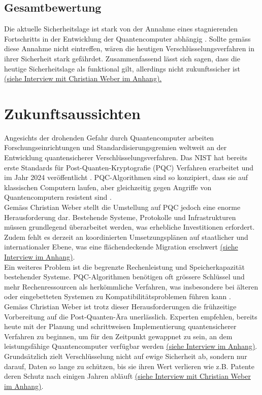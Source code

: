 \subsection{Gesamtbewertung}
Die aktuelle Sicherheitslage ist stark von der Annahme eines
stagnierenden Fortschritts in der Entwicklung der Quantencomputer
abhängig \cite{mandrysch2016}.
Sollte gemäss diese Annahme nicht eintreffen, wären die heutigen
Verschlüsselungsverfahren in ihrer Sicherheit stark gefährdet.
Zusammenfassend lässt sich sagen, dass die heutige Sicherheitslage als
funktional gilt, allerdings nicht zukunftssicher ist \hyperlink{overall_security}{(siehe Interview mit Christian Weber im Anhang).}
\pagebreak
\section{Zukunftsaussichten}
Angesichts der drohenden Gefahr durch Quantencomputer arbeiten Forschungseinrichtungen und Standardisierungsgremien weltweit an der Entwicklung quantensicherer Verschlüsselungsverfahren.
Das NIST hat bereits erste Standards für Post-Quanten-Kryptografie (PQC) Verfahren erarbeitet und im Jahr 2024 veröffentlicht \cite{nistpqc}.
PQC-Algorithmen sind so konzipiert, dass sie auf klassischen Computern laufen, aber gleichzeitig gegen Angriffe von Quantencomputern resistent sind \cite{srfEinsteinQuantencomputer}.
\\
Gemäss Christian Weber stellt die Umstellung auf PQC jedoch eine enorme Herausforderung dar.
Bestehende Systeme, Protokolle und Infrastrukturen müssen grundlegend überarbeitet werden, was erhebliche Investitionen erfordert.
Zudem fehlt es derzeit an koordinierten Umsetzungsplänen auf staatlicher und internationaler Ebene, was eine flächendeckende Migration erschwert \hyperlink{pqc_migration}{(siehe Interview im Anhang)}.
\\
Ein weiteres Problem ist die begrenzte Rechenleistung und Speicherkapazität bestehender Systeme.
PQC-Algorithmen benötigen oft grössere Schlüssel und mehr Rechenressourcen als herkömmliche Verfahren, was insbesondere bei älteren oder eingebetteten Systemen zu Kompatibilitätsproblemen führen kann \cite{fraunhoferPQC}.
\\
Gemäss Christian Weber ist trotz dieser Herausforderungen die frühzeitige Vorbereitung auf die Post-Quanten-Ära unerlässlich.
Experten empfehlen, bereits heute mit der Planung und schrittweisen Implementierung quantensicherer Verfahren zu beginnen, um für den Zeitpunkt gewappnet zu sein, an dem leistungsfähige Quantencomputer verfügbar werden \hyperlink{pqc_migration}{(siehe Interview im Anhang)}.
\\
Grundsätzlich zielt Verschlüsselung nicht auf ewige Sicherheit ab, sondern nur darauf, 
Daten so lange zu schützen, bis sie ihren Wert verlieren wie z.B. Patente deren Schutz nach einigen Jahren abläuft \hyperlink{pqc_security}{(siehe Interview mit Christian Weber im Anhang)}.

